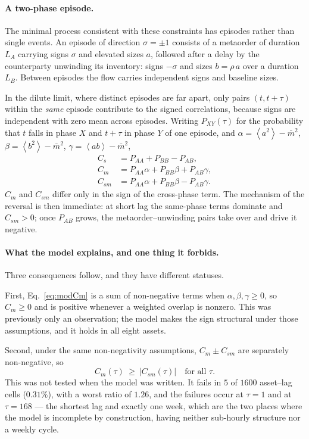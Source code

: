 \documentclass[aps,pre,twocolumn,superscriptaddress,floatfix,nofootinbib]{revtex4-2}
\newcommand{\avg}[1]{\left\langle #1 \right\rangle}
\begin{document}
\paragraph*{A two-phase episode.}
The minimal process consistent with these constraints has episodes rather than
single events. An episode of direction $\sigma=\pm1$ consists of a metaorder of
duration $L_A$ carrying signs $\sigma$ and elevated sizes $a$, followed after a
delay by the counterparty unwinding its inventory: signs $-\sigma$ and sizes
$b=\rho\,a$ over a duration $L_B$. Between episodes the flow carries
independent signs and baseline sizes.

In the dilute limit, where distinct episodes are far apart, only pairs
$(t,t+\tau)$ within the \emph{same} episode contribute to the signed
correlations, because signs are independent with zero mean across episodes.
Writing $P_{XY}(\tau)$ for the probability that $t$ falls in phase $X$ and
$t+\tau$ in phase $Y$ of one episode, and
$\alpha=\avg{a^2}-\bar m^2$, $\beta=\avg{b^2}-\bar m^2$,
$\gamma=\avg{ab}-\bar m^2$,
\begin{align}
  C_s     &= P_{AA}+P_{BB}-P_{AB} , \label{eq:modCs}\\
  C_m     &= P_{AA}\alpha+P_{BB}\beta+P_{AB}\gamma , \label{eq:modCm}\\
  C_{sm}  &= P_{AA}\alpha+P_{BB}\beta-P_{AB}\gamma . \label{eq:modCsm}
\end{align}
$C_m$ and $C_{sm}$ differ only in the sign of the cross-phase term. The
mechanism of the reversal is then immediate: at short lag the same-phase terms
dominate and $C_{sm}>0$; once $P_{AB}$ grows, the metaorder--unwinding pairs
take over and drive it negative.

\paragraph*{What the model explains, and one thing it forbids.}
Three consequences follow, and they have different statuses.

First, Eq.~\eqref{eq:modCm} is a sum of non-negative terms when
$\alpha,\beta,\gamma\ge0$, so $C_m\ge0$ and is positive whenever a weighted
overlap is nonzero. This was previously only an observation; the model makes
the sign structural under those assumptions, and it holds in all eight assets.

Second, under the same non-negativity assumptions,
$C_m\pm C_{sm}$ are separately non-negative, so
\begin{equation}
  C_m(\tau)\ \ge\ \bigl|C_{sm}(\tau)\bigr| \quad\text{for all }\tau .
  \label{eq:P2}
\end{equation}
This was not tested when the model was written. It fails in $5$ of $1600$
asset--lag cells ($0.31\%$), with a worst ratio of $1.26$, and the failures
occur at $\tau=1$ and at $\tau=168$ --- the shortest lag and exactly one week,
which are the two places where the model is incomplete by construction, having
neither sub-hourly structure nor a weekly cycle.
\end{document}
